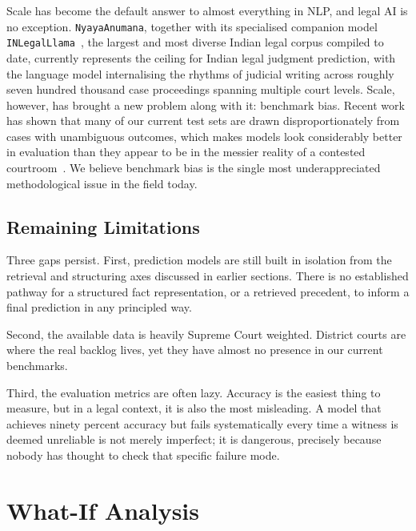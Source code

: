 Scale has become the default answer to almost everything in NLP, and legal AI is no exception. \texttt{NyayaAnumana}, together with its specialised companion model \texttt{INLegalLlama}~\cite{nigam-etal-2025-nyayaanumana}, the largest and most diverse Indian legal corpus compiled to date, currently represents the ceiling for Indian legal judgment prediction, with the language model internalising the rhythms of judicial writing across roughly seven hundred thousand case proceedings spanning multiple court levels. Scale, however, has brought a new problem along with it: benchmark bias. Recent work has shown that many of our current test sets are drawn disproportionately from cases with unambiguous outcomes, which makes models look considerably better in evaluation than they appear to be in the messier reality of a contested courtroom~\cite{nigam-etal-2024-rethinking}. We believe benchmark bias is the single most underappreciated methodological issue in the field today.

\subsection{Remaining Limitations}

Three gaps persist. First, prediction models are still built in isolation from the retrieval and structuring axes discussed in earlier sections. There is no established pathway for a structured fact representation, or a retrieved precedent, to inform a final prediction in any principled way.

Second, the available data is heavily Supreme Court weighted. District courts are where the real backlog lives, yet they have almost no presence in our current benchmarks.

Third, the evaluation metrics are often lazy. Accuracy is the easiest thing to measure, but in a legal context, it is also the most misleading. A model that achieves ninety percent accuracy but fails systematically every time a witness is deemed unreliable is not merely imperfect; it is dangerous, precisely because nobody has thought to check that specific failure mode.

\section{What-If Analysis}

